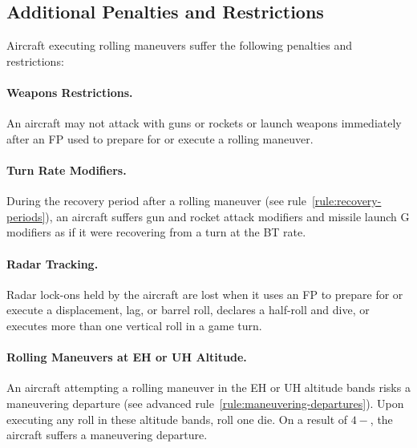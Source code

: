 {\subsection{Additional Penalties and Restrictions}

Aircraft executing rolling maneuvers suffer the following penalties and restrictions:


\paragraph{Weapons Restrictions.} An aircraft may not attack with guns or rockets or launch weapons immediately after an FP used to prepare for or execute a rolling maneuver.

\paragraph{Turn Rate Modifiers.} During the recovery period after a rolling maneuver (see rule~\ref{rule:recovery-periods}), an aircraft suffers gun and rocket attack modifiers and missile launch G modifiers as if it were recovering from a turn at the BT rate.

\paragraph{Radar Tracking.} Radar lock-ons held by the aircraft are lost when it uses an FP to prepare for or execute a displacement, lag, or barrel roll, declares a half-roll and dive, or executes more than one vertical roll in a game turn.

\paragraph{Rolling Maneuvers at EH or UH Altitude.} \label{rule:rolling-maneuvers-at-eh-or-uh-altitude} An aircraft attempting a rolling maneuver in the EH or UH altitude bands risks a maneuvering departure (see advanced rule~\ref{rule:maneuvering-departures}). Upon executing any roll in these altitude bands,  roll one die. On a result of $4-$, the aircraft suffers a maneuvering departure.
}

